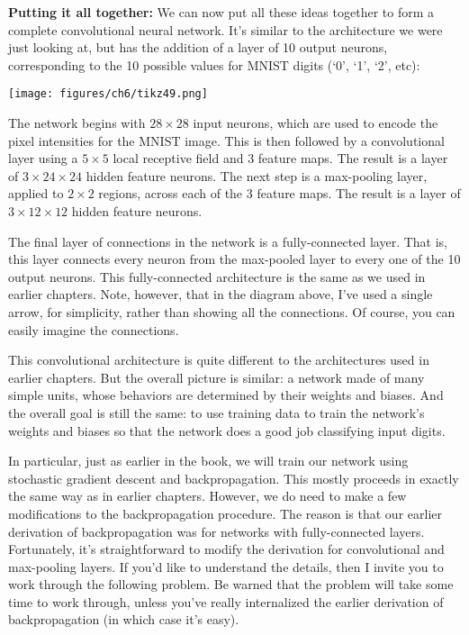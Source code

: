 \documentclass[a4paper,twoside,10pt]{book}
\begin{document}
\textbf{Putting it all together:} We can now put all these ideas together to form a complete convolutional neural network. It's similar to the architecture we were just looking at, but has the addition of a layer of 10 output neurons, corresponding to the 10 possible values for MNIST digits (`0', `1', `2', etc):
\begin{center}
	\texttt{[image: figures/ch6/tikz49.png]}
\end{center}
The network begins with $28\times28$ input neurons, which are used to encode the pixel intensities for the MNIST image. This is then followed by a convolutional layer using a $5\times5$ local receptive field and 3 feature maps. The result is a layer of $3\times24\times24$ hidden feature neurons. The next step is a max-pooling layer, applied to $2\times2$ regions, across each of the 3 feature maps. The result is a layer of $3\times12\times12$ hidden feature neurons.

The final layer of connections in the network is a fully-connected layer. That is, this layer connects every neuron from the max-pooled layer to every one of the 10 output neurons. This fully-connected architecture is the same as we used in earlier chapters. Note, however, that in the diagram above, I've used a single arrow, for simplicity, rather than showing all the connections. Of course, you can easily imagine the connections.

This convolutional architecture is quite different to the architectures used in earlier chapters. But the overall picture is similar: a network made of many simple units, whose behaviors are determined by their weights and biases. And the overall goal is still the same: to use training data to train the network's weights and biases so that the network does a good job classifying input digits.

In particular, just as earlier in the book, we will train our network using stochastic gradient descent and backpropagation. This mostly proceeds in exactly the same way as in earlier chapters. However, we do need to make a few modifications to the backpropagation procedure. The reason is that our earlier derivation of backpropagation was for networks with fully-connected layers. Fortunately, it's straightforward to modify the derivation for convolutional and max-pooling layers. If you'd like to understand the details, then I invite you to work through the following problem. Be warned that the problem will take some time to work through, unless you've really internalized the earlier derivation of backpropagation (in which case it's easy).
\end{document}

